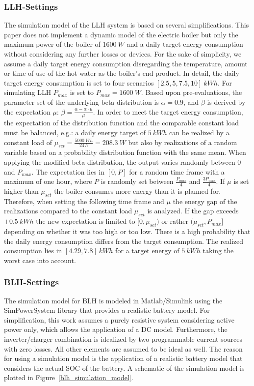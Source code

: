 \documentclass{article}
\begin{document}
\subsubsection{\ac{LLH}-Settings}
The simulation model of the \ac{LLH} system is based on several simplifications.
This paper does not implement a dynamic model of the electric boiler but only the maximum power of the boiler of $1600\:W$ and a daily target energy consumption without considering any further losses or devices. 
For the sake of simplicity, we assume a daily target energy consumption disregarding the temperature, amount or time of use of the hot water as the boiler's end product.
In detail, the daily target energy consumption is set to four scenarios $[2.5, 5, 7.5, 10]\: kWh$.
For simulating \ac{LLH} $P_{max}$ is set to $P_{max}=1600 \: W$. Based upon pre-evaluations, the parameter set of the underlying beta distribution is $\alpha=0.9$, and $\beta$ is derived by the expectation $\mu$: $\beta=\frac{\alpha - \alpha \cdot \mu}{\mu}$. In order to meet the target energy consumption, the expectation of the distribution function and the comparable constant load must be balanced, e.g.: a daily energy target of $5 \: kWh$ can be realized by a constant load of $\mu_{set} = \frac{5000 \: Wh}{24 \: h} = 208.\dot{3} \: W$ but also by realizations of a random variable based on a probability distribution function with the same mean. 
When applying the modified beta distribution, the output varies randomly between $0$ and $P_{max}$. The expectation lies in $[0, P]$ for a random time frame with a maximum of one hour, where $P$ is randomly set between $\frac{P_{max}}{4}$ and $\frac{3 P_{max}}{4}$. If $\mu$ is set higher than $\mu_{set}$ the boiler consumes more energy than it is planned for. Therefore, when setting the following time frame and $\mu$ the energy gap of the realizations compared to the constant load $\mu_{set}$ is analyzed. If the gap exceeds $\pm 0.5 \: kWh$ the new expectation is limited to $[0,\mu_{set})$ or rather $(\mu_{set}, P_{max}]$ depending on whether it was too high or too low. There is a high probability that the daily energy consumption differs from the target consumption. The realized consumption lies in $[4.29,7.8]\: kWh$ for a target energy of $5 \: kWh$ taking the worst case into account.

\subsubsection{BLH-Settings}
The simulation model for \ac{BLH} is modeled in Matlab/Simulink using the SimPowerSystem library that provides a realistic battery model. 
For simplification, this work assumes a purely resistive system considering active power only, which allows the application of a DC model. Furthermore, the inverter/charger combination is idealized by two programmable current sources with zero losses. All other elements are assumed to be ideal as well. The reason for using a simulation model is the application of a realistic battery model that considers the actual \ac{SOC} of the battery. A schematic of the simulation model is plotted in Figure~\ref{blh_simulation_model}.
\end{document}
